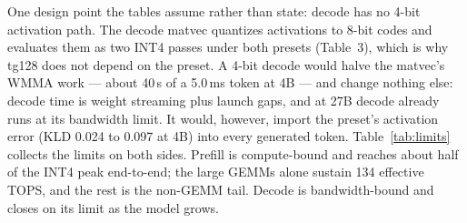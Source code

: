 \documentclass[10.5pt,a4paper]{article}
\newcommand{\tx}[1]{\texttt{\detokenize{#1}}}
\begin{document}
One design point the tables assume rather than state: decode has no 4-bit activation path. The decode matvec quantizes activations to 8-bit codes and evaluates them as two INT4 passes under both
presets (Table~3), which is why tg128 does not depend on the preset. A 4-bit decode would halve the matvec's WMMA work --- about 40\,\textmu s of a 5.0\,ms token at 4B --- and change nothing else:
decode time is weight streaming plus launch gaps, and at 27B decode already runs at its bandwidth limit. It would, however, import the \tx{fast} preset's activation error (KLD 0.024 to 0.097 at 4B)
into every generated token. Table~\ref{tab:limits} collects the limits on both sides. Prefill is compute-bound and reaches about half of the INT4 peak end-to-end; the large GEMMs alone sustain 134
effective TOPS, and the rest is the non-GEMM tail. Decode is bandwidth-bound and closes on its limit as the model grows.
\end{document}
